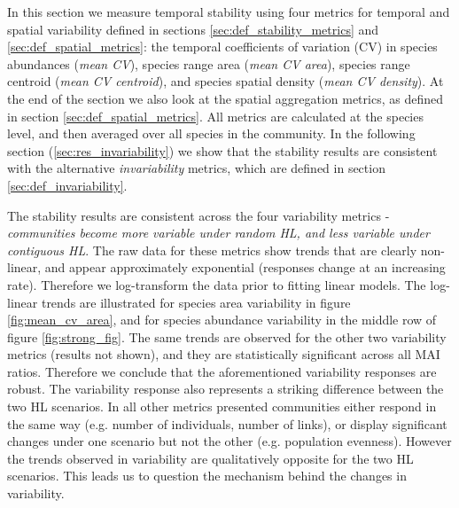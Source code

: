 In this section we measure temporal stability using four metrics for temporal and spatial variability defined in sections \ref{sec:def_stability_metrics} and \ref{sec:def_spatial_metrics}: the temporal coefficients of variation (CV) in species abundances (\emph{mean CV}), species range area (\emph{mean CV area}), species range centroid (\emph{mean CV centroid}), and species spatial density (\emph{mean CV density}). At the end of the section we also look at the spatial aggregation metrics, as defined in section \ref{sec:def_spatial_metrics}. All metrics are calculated at the species level, and then averaged over all species in the community. In the following section (\ref{sec:res_invariability}) we show that the stability results are consistent with the alternative \emph{invariability} metrics, which are defined in section \ref{sec:def_invariability}.

The stability results are consistent across the four variability metrics - \emph{communities become more variable under random HL, and less variable under contiguous HL}. The raw data for these metrics show trends that are clearly non-linear, and appear approximately exponential (responses change at an increasing rate). Therefore we log-transform the data prior to fitting linear models. The log-linear trends are illustrated for species area variability in figure \ref{fig:mean_cv_area}, and for species abundance variability in the middle row of figure \ref{fig:strong_fig}. The same trends are observed for the other two variability metrics (results not shown), and they are statistically significant across all MAI ratios. Therefore we conclude that the aforementioned variability responses are robust. The variability response also represents a striking difference between the two HL scenarios. In all other metrics presented communities either respond in the same way (e.g. number of individuals, number of links), or display significant changes under one scenario but not the other (e.g. population evenness). However the trends observed in variability are qualitatively opposite for the two HL scenarios. This leads us to question the mechanism behind the changes in variability.

